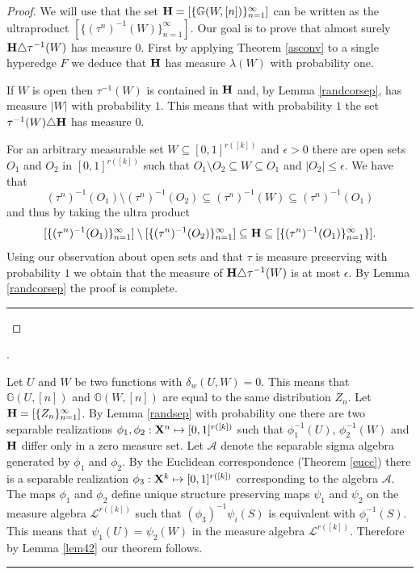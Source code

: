 \documentclass [11pt] {article}
\newcommand{\qed} {\hspace {0.1in} \rule {1.5mm} {3.5mm}}
\def\bH{{\bf H}}
\def\xo{{\bf X}}
\begin{document}
\begin{proof} We will use that the set 
$\bH=[\{\mathbb{G}(W,[n])\}_{n=1}^\infty]$ can be written as the ultraproduct
$[\{(\tau^n)^{-1}(W)\}_{n=1}^\infty]$. Our goal is to prove that 
almost surely $\bH\triangle\tau^{-1}(W)$ has measure $0$.
First by applying Theorem \ref{asconv} to a single hyperedge $F$
 we deduce that $\bH$ has measure $\lambda(W)$ with probability one.

If $W$ is open then $\tau^{-1}(W)$ is contained in $\bH$ and, by Lemma
\ref{randcorsep}, has measure $|W|$ with probability $1$. This means that 
with probability $1$ the set $\tau^{-1}(W)\triangle \bH$ has measure $0$.

For an arbitrary measurable set $W\subseteq [0,1]^{r([k])}$ and $\epsilon>0$
there are open sets $O_1$ and $O_2$ in $[0,1]^{r([k])}$ such that 
$O_1\setminus O_2\subseteq W\subseteq O_1$ and $|O_2|\leq\epsilon$. 
We have that
$$(\tau^n)^{-1}(O_1)\setminus(\tau^n)^{-1}(O_2)\subseteq 
(\tau^n)^{-1}(W)\subseteq(\tau^n)^{-1}(O_1)$$
and thus by taking the ultra product
$$[\{(\tau^n)^{-1}(O_1)\}_{n=1}^\infty]
\setminus[\{(\tau^n)^{-1}(O_2)\}_{n=1}^\infty]
\subseteq\bH\subseteq[\{(\tau^n)^{-1}(O_1)\}_{n=1}^\infty\}].$$
Using our observation about open sets and that 
$\tau$ is measure preserving with probability $1$ 
we obtain that the measure of $\bH\triangle\tau^{-1}(W)$ is at 
most $\epsilon$. By Lemma \ref{randcorsep} the proof is complete.\qed
\end{proof}

\bigskip

.

\noindent
Let $U$ and $W$ be two functions with $\delta_w(U,W)=0$. This means that
$\mathbb{G}(U,[n])$ and $\mathbb{G}(W,[n])$ are equal to the same distribution
$Z_n$. 
Let $\bH=[\{Z_n\}_{n=1}^\infty]$. By Lemma \ref{randsep} with probability one
there are two separable realizations $\phi_1,
\phi_2:\xo^n\mapsto [0,1]^{r([k])}$ such that $\phi_1^{-1}(U)$, 
$\phi_2^{-1}(W)$ and $\bH$ differ only in a zero measure set. Let
$\mathcal{A}$ denote the separable sigma algebra generated by $\phi_1$ 
and $\phi_2$. By the Euclidean correspondence (Theorem \ref{eucc}) there is a
separable realization $\phi_3:\xo^k\mapsto [0,1]^{r([k])}$ 
corresponding to the algebra $\mathcal{A}$. The maps $\phi_1$ and $\phi_2$ 
define unique structure preserving maps $\psi_1$ and $\psi_2$ on the 
measure algebra $\mathcal{L}^{r([k])}$ such that $(\phi_3)^{-1}\psi_i(S)$ is
equivalent with $\phi_i^{-1}(S)$. This means that $\psi_1(U)=\psi_2(W)$ 
in the measure algebra $\mathcal{L}^{r([k])}$.
Therefore by Lemma \ref{lem42} our theorem follows. \qed
\end{document}
